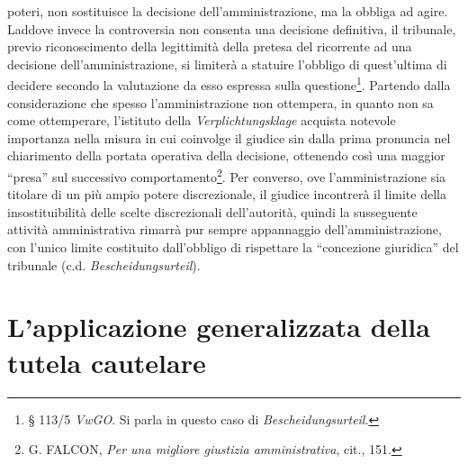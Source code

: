 \documentclass[12pt,it,a4paper,]{report}
\begin{document}
poteri, non sostituisce la decisione dell'amministrazione, ma la obbliga
ad agire. Laddove invece la controversia non consenta una decisione
definitiva, il tribunale, previo riconoscimento della legittimità della
pretesa del ricorrente ad una decisione dell'amministrazione, si
limiterà a statuire l'obbligo di quest'ultima di decidere secondo la
valutazione da esso espressa sulla questione\footnote{§ 113/5
  \emph{VwGO}. Si parla in questo caso di \emph{Bescheidungsurteil}.}.
Partendo dalla considerazione che spesso l'amministrazione non
ottempera, in quanto non sa come ottemperare, l'istituto della
\emph{Verplichtungsklage} acquista notevole importanza nella misura in
cui coinvolge il giudice sin dalla prima pronuncia nel chiarimento della
portata operativa della decisione, ottenendo così una maggior ``presa''
sul successivo comportamento\footnote{G. FALCON, \emph{Per una migliore
  giustizia amministrativa}, cit., 151.}. Per converso, ove
l'amministrazione sia titolare di un più ampio potere discrezionale, il
giudice incontrerà il limite della insostituibilità delle scelte
discrezionali dell'autorità, quindi la susseguente attività
amministrativa rimarrà pur sempre appannaggio dell'amministrazione, con
l'unico limite costituito dall'obbligo di rispettare la ``concezione
giuridica'' del tribunale (c.d. \emph{Bescheidungsurteil}).

\hypertarget{lapplicazione-generalizzata-della-tutela-cautelare}{%
\section{L'applicazione generalizzata della tutela
cautelare}\label{lapplicazione-generalizzata-della-tutela-cautelare}}
\end{document}
